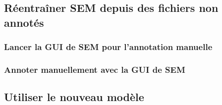 \documentclass[12pt]{article}
\begin{document}
        \subsection{Réentraîner SEM depuis des fichiers non annotés}
        \label{sec:retrain-sem-unannotated}
        
        
            \subsubsection{Lancer la GUI de SEM pour l'annotation manuelle}
            \label{subsubsec:launch-sem-annotation-gui}
            
        
            \subsubsection{Annoter manuellement avec la GUI de SEM}
            \label{subsubsec:manually-annotate-with-sem}
            
        
        \subsection{Utiliser le nouveau modèle}
        \label{subsec:use-new-model}
        
    
    
    
\end{document}
